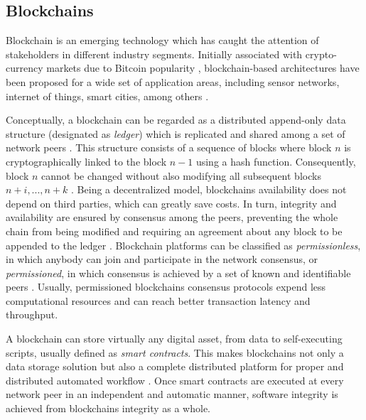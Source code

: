 \documentclass[journal]{IEEEtran}
\begin{document}
\subsection{Blockchains}
Blockchain is an emerging technology which has caught the attention of stakeholders in different industry segments. 
Initially associated with crypto-currency markets due to Bitcoin popularity \cite{Nakamoto2008}, blockchain-based architectures have been proposed for a wide set of application areas, including sensor networks, internet of things, smart cities, among others \cite{Christidis2016}. 

Conceptually, a blockchain can be regarded as a distributed append-only data structure (designated as \emph{ledger}) which is replicated and shared among a set of network peers \cite{Christidis2016}. 
This structure consists of a sequence of blocks where block $n$ is cryptographically linked to the block $n-1$ using a hash function.
Consequently, block $n$ cannot be changed without also modifying all subsequent blocks $n + i, ..., n + k$ \cite{Sousa2018}. 
Being a decentralized model, blockchains availability does not depend on third parties, which can greatly save costs.
In turn, integrity and availability are ensured by consensus among the peers, preventing the whole chain from being modified and requiring an agreement about any block to be appended to the ledger \cite{Sousa2018,Vukolic2016}.
Blockchain platforms can be classified as \emph{permissionless}, in which anybody can join and participate in the network consensus, or \emph{permissioned}, in which consensus is achieved by a set of known and identifiable peers \cite{Vukolic2016}. Usually, permissioned blockchains consensus protocols expend less computational resources and can reach better transaction latency and throughput.

A blockchain can store virtually any digital asset, from data to self-executing scripts, usually defined as \emph{smart contracts}. %
This makes blockchains not only a data storage solution but also a complete distributed platform for proper and distributed automated workflow \cite{Christidis2016}.
Once smart contracts are executed at every network peer in an independent and automatic manner, software integrity is achieved from blockchains integrity as a whole. 
\end{document}
